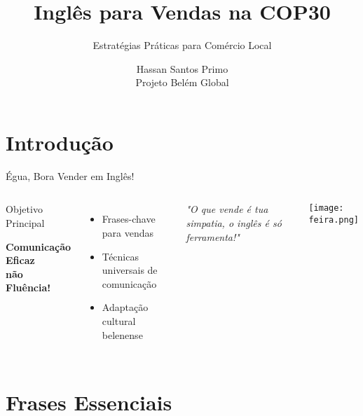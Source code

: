 \documentclass[12pt]{beamer}
\title[Inglês para Vendas na COP30]{\textbf{Inglês para Vendas na COP30}}
\subtitle{Estratégias Práticas para Comércio Local}
\author[Hassan S. Primo]{Hassan Santos Primo\\\small Projeto Belém Global}
\date{}
\begin{document}
\begin{frame}
  \titlepage
\end{frame}

\section{Introdução}

\begin{frame}{Égua, Bora Vender em Inglês!}
  \begin{columns}
    \begin{block}{Objetivo Principal}
      \begin{center}
        \Large\textbf{Comunicação Eficaz \\ não Fluência!}
      \end{center}
    \end{block}
    
    \begin{itemize}
      \item Frases-chave para vendas
      \item Técnicas universais de comunicação
      \item Adaptação cultural belenense
    \end{itemize}
    
    \vspace{5mm}
    \textit{"O que vende é tua simpatia, o inglês é só ferramenta!"}
    
    \texttt{[image: feira.png]}
  \end{columns}
\end{frame}

\section{Frases Essenciais}
\end{document}
